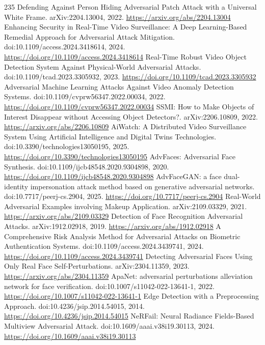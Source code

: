 \documentclass[11pt]{article}
\begin{document}
\begin{thebibliography}{235}
 Defending Against Person Hiding Adversarial Patch Attack with a Universal White Frame. arXiv:2204.13004, 2022. \url{https://arxiv.org/abs/2204.13004}
 Enhancing Security in Real-Time Video Surveillance: A Deep Learning-Based Remedial Approach for Adversarial Attack Mitigation. doi:10.1109/access.2024.3418614, 2024. \url{https://doi.org/10.1109/access.2024.3418614}
 Real-Time Robust Video Object Detection System Against Physical-World Adversarial Attacks. doi:10.1109/tcad.2023.3305932, 2023. \url{https://doi.org/10.1109/tcad.2023.3305932}
 Adversarial Machine Learning Attacks Against Video Anomaly Detection Systems. doi:10.1109/cvprw56347.2022.00034, 2022. \url{https://doi.org/10.1109/cvprw56347.2022.00034}
 SSMI: How to Make Objects of Interest Disappear without Accessing Object Detectors?. arXiv:2206.10809, 2022. \url{https://arxiv.org/abs/2206.10809}
 AiWatch: A Distributed Video Surveillance System Using Artificial Intelligence and Digital Twins Technologies. doi:10.3390/technologies13050195, 2025. \url{https://doi.org/10.3390/technologies13050195}
 AdvFaces: Adversarial Face Synthesis. doi:10.1109/ijcb48548.2020.9304898, 2020. \url{https://doi.org/10.1109/ijcb48548.2020.9304898}
 AdvFaceGAN: a face dual-identity impersonation attack method based on generative adversarial networks. doi:10.7717/peerj-cs.2904, 2025. \url{https://doi.org/10.7717/peerj-cs.2904}
 Real-World Adversarial Examples involving Makeup Application. arXiv:2109.03329, 2021. \url{https://arxiv.org/abs/2109.03329}
 Detection of Face Recognition Adversarial Attacks. arXiv:1912.02918, 2019. \url{https://arxiv.org/abs/1912.02918}
 A Comprehensive Risk Analysis Method for Adversarial Attacks on Biometric Authentication Systems. doi:10.1109/access.2024.3439741, 2024. \url{https://doi.org/10.1109/access.2024.3439741}
 Detecting Adversarial Faces Using Only Real Face Self-Perturbations. arXiv:2304.11359, 2023. \url{https://arxiv.org/abs/2304.11359}
 ApaNet: adversarial perturbations alleviation network for face verification. doi:10.1007/s11042-022-13641-1, 2022. \url{https://doi.org/10.1007/s11042-022-13641-1}
 Edge Detection with a Preprocessing Approach. doi:10.4236/jsip.2014.54015, 2014. \url{https://doi.org/10.4236/jsip.2014.54015}
 NeRFail: Neural Radiance Fields-Based Multiview Adversarial Attack. doi:10.1609/aaai.v38i19.30113, 2024. \url{https://doi.org/10.1609/aaai.v38i19.30113}

\end{thebibliography}
\end{document}
